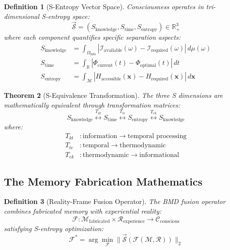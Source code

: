 \documentclass[12pt,a4paper]{article}
\newtheorem{theorem}{Theorem}[section]
\newtheorem{definition}[theorem]{Definition}
\begin{document}
\begin{definition}[S-Entropy Vector Space]
Consciousness operates in tri-dimensional S-entropy space:
\begin{equation}
\vec{\mathcal{S}} = (S_{\text{knowledge}}, S_{\text{time}}, S_{\text{entropy}}) \in \mathbb{R}_+^3
\end{equation}
where each component quantifies specific separation aspects:
\begin{align}
S_{\text{knowledge}} &= \int_{\Omega_{\text{info}}} |\mathcal{I}_{\text{available}}(\omega) - \mathcal{I}_{\text{required}}(\omega)| \, d\mu(\omega) \\
S_{\text{time}} &= \int_{\mathbb{R}} |\Phi_{\text{current}}(t) - \Phi_{\text{optimal}}(t)| \, dt \\
S_{\text{entropy}} &= \int_{\mathcal{M}} |H_{\text{accessible}}(\mathbf{x}) - H_{\text{required}}(\mathbf{x})| \, d\mathbf{x}
\end{align}
\end{definition}

\begin{theorem}[S-Equivalence Transformation]
The three S dimensions are mathematically equivalent through transformation matrices:
\begin{equation}
S_{\text{knowledge}} \stackrel{T_{kt}}{\longleftrightarrow} S_{\text{time}} \stackrel{T_{te}}{\longleftrightarrow} S_{\text{entropy}} \stackrel{T_{ek}}{\longleftrightarrow} S_{\text{knowledge}}
\end{equation}
where:
\begin{align}
T_{kt} &: \text{information} \to \text{temporal processing} \\
T_{te} &: \text{temporal} \to \text{thermodynamic} \\
T_{ek} &: \text{thermodynamic} \to \text{informational}
\end{align}
\end{theorem}

\subsection{The Memory Fabrication Mathematics}

\begin{definition}[Reality-Frame Fusion Operator]
The BMD fusion operator combines fabricated memory with experiential reality:
\begin{equation}
\mathcal{F}: \mathcal{M}_{\text{fabricated}} \times \mathcal{R}_{\text{experience}} \to \mathcal{C}_{\text{conscious}}
\end{equation}
satisfying S-entropy optimization:
\begin{equation}
\mathcal{F}^* = \arg\min_{\mathcal{F}} \|\vec{\mathcal{S}}(\mathcal{F}(\mathcal{M}, \mathcal{R}))\|_2
\end{equation}
\end{definition}
\end{document}
